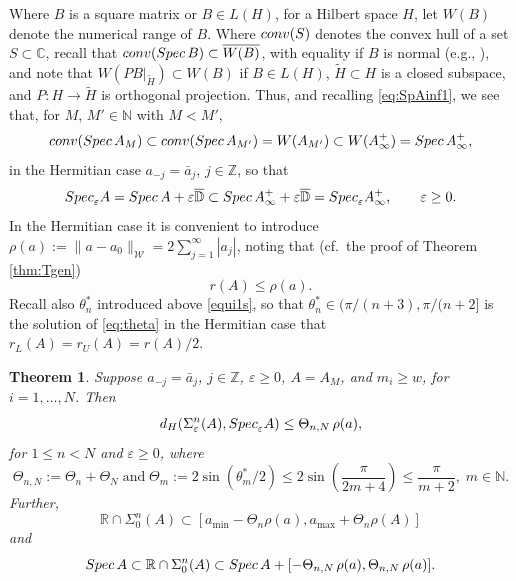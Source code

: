\documentclass[preprint,1p,11pt]{elsarticle}
\newcommand\C{{\mathbb C}}
\newcommand\D{{\mathbb D}}
\newcommand\N{{\mathbb N}}
\newcommand\R{{\mathbb R}}
\newcommand\Z{{\mathbb Z}}
\newcommand\eps{{\varepsilon}}
\newcommand\Spec{{\rm Spec}\,}  %
\newcommand\Specn{{\rm Spec}}   %
\newcommand\Speps{{\rm Spec}_\eps}
\newcommand\conv{{\rm conv}}
\newtheorem{theorem}{Theorem}[section]
\numberwithin{equation}{section}   %
\numberwithin{figure}{section}  %
\begin{document}
Where $B$ is a square matrix or $B\in L(H)$, for a Hilbert space $H$, let $W(B)$ denote the numerical range of $B$.  Where $\conv(S)$ denotes the convex hull of a set $S\subset \C$, recall that $\conv(\Spec B)\subset \overline{W(B)}$, with equality if $B$ is normal (e.g., \cite{GusRao97}), and note  that $W(PB|_{\widetilde H})\subset W(B)$ if $B\in L(H)$, $\widetilde H\subset H$ is a closed subspace, and $P:H\to\widetilde H$ is orthogonal projection. Thus, and recalling \eqref{eq:SpAinf1}, we see that, for $M$, $M'\in \N$ with $M<M'$,
\begin{equation} \label{eq:conv}
\conv(\Spec A_M) \subset \conv(\Spec A_{M'}) = W(A_{M'}) \subset W(A_\infty^{+}) = \Spec A_\infty^{+},
\end{equation}
 in the Hermitian case $a_{-j} = \bar a_j$, $j\in \Z$, so that 
\begin{equation} \label{eq:inclH}
\Specn_\eps A = \Spec A + \eps \overline{\D} \subset \Spec A^+_\infty + \eps\overline{\D}=\Specn_\eps A^+_\infty, \qquad \eps\geq 0.
\end{equation}
In the Hermitian case it is convenient to introduce
$\rho(a) := \|a-a_0\|_{\mathcal{W}} = 2\sum_{j=1}^\infty |a_j|$,
noting that (cf.~the proof of Theorem \ref{thm:Tgen})
\begin{equation}\label{eq:rAb}
r(A) \leq \rho(a).
\end{equation}
Recall also $\theta_n^*$ introduced above \eqref{equi1s}, so that $\theta_n^*\in (\pi/(n+3),\pi/(n+2]$ is the solution of \eqref{eq:theta} in the Hermitian case that $r_L(A)=r_U(A)=r(A)/2$.
\begin{theorem} \label{thm:Herm}
Suppose $a_{-j} = \bar a_j$, $j\in \Z$, $\eps\geq 0$, $A=A_M$, and $m_i\geq w$, for $i=1,\ldots,N$. Then 
\begin{equation} \label{eq:dHSS}
d_H(\Sigma_\eps^n(A),\Speps A) \leq \Theta_{n,N}\,\rho(a),
\end{equation}
for $1\leq n<N$ and $\eps\geq 0$, where 
$$
\Theta_{n,N} :=  \Theta_n+\Theta_N \; \mbox{and} \; \Theta_m := 2\sin(\theta^*_m/2) \leq 2\sin\left(\frac{\pi}{2m+4}\right)\leq\frac{\pi}{m+2}, \; m\in \N.
$$ 
Further, 
\begin{equation} \label{eq:RcS}
\R\cap \Sigma_0^n(A) \subset [a_{\min}-\Theta_n \rho(a), a_{\max}+\Theta_n\rho(A)]
\end{equation}
and
\begin{equation} \label{eq:Rincl}
\Spec A \subset \R\cap \Sigma_0^n(A) \subset \Spec A + [-\Theta_{n,N}\,\rho(a),\Theta_{n,N}\,\rho(a)].
\end{equation}
\end{theorem}
\end{document}
